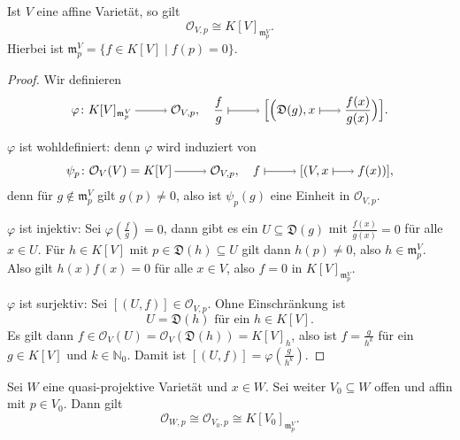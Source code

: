 \documentclass[a4paper,12pt]{scrbook}
\theoremstyle{keinenummern} %
\theoremstyle{mitnummern}
\theoremstyle{unserbeweis}
\newtheorem{proof}{Beweis}
\def\O{\mathcal{O}}
\newcommand{\D}{\mathfrak{D}}
\def\m{\mathfrak{m}}
\renewcommand{\phi}{\varphi}
\newcommand{\set}[1]{\ensuremath{\mathbb{#1}}}
\newcommand{\N}{\set{N}}
\newcommand{\smapsto}{\raisebox{-1pt}{\tikz{\draw[thin,shorten >=3pt, |->] (0,0) node{\hspace*{0pt}} -- node{} (0.7,0);}}\penalty1000\relax}
\newcommand{\ra}{\raisebox{-1pt}{\tikz{\draw[thin,shorten >=3pt, ->] (0,0) node{\hspace*{-2pt}} -- node{} (1,0);}}\penalty1000\relax}
\renewcommand{\mapsto}{\raisebox{-1pt}{\tikz{\draw[thin,shorten >=3pt, |->] (0,0) node{\hspace*{0pt}} -- node{} (1,0);}}\penalty1000\relax}
\begin{document}
\begin{prop}\label{3.1.5}
  Ist $V$ eine affine Varietät, so gilt \[ \O_{V,p}\cong K[V]_{\m_p^V}. \]
  Hierbei ist $\m_p^V = \{ f\in K[V] \mid f(p)=0\}$.
\end{prop}
\begin{proof}
  Wir definieren
  \[ \phi\colon K[V]_{\m_p^V}\ra\O_{V,p},\quad\frac{f}{g}\mapsto\Bigl[\Bigl(\D(g),x\smapsto\frac{f(x)}{g(x)}\Bigr)\Bigr]. \]

  $\phi$ ist wohldefiniert: denn $\phi$ wird induziert von
  \[ \psi_p\colon \O_V(V)=K[V]\ra\O_{V,p},\quad f\mapsto[(V,x\smapsto f(x))], \]
  denn für $g\notin \m_p^V$ gilt $g(p)\neq0$, also ist $\psi_p(g)$ eine Einheit in $\O_{V,p}$.

  $\phi$ ist injektiv: Sei $\phi(\frac{f}{g})=0$, dann gibt es ein $U\subseteq\D(g)$ mit $\frac{f(x)}{g(x)}=0$ für alle $x\in
  U$. Für $h\in K[V]$ mit $p\in\D(h)\subseteq U$ gilt dann $h(p)\neq0$, also $h\in \m_p^V$. Also gilt $h(x)f(x)=0$ für alle
  $x\in V$, also $f=0$ in $K[V]_{\m_p^V}$.

  $\phi$ ist surjektiv: Sei $[(U,f)]\in\O_{V,p}$. Ohne Einschränkung ist \[U=\D(h)\text{ für ein }h\in K[V].\] Es gilt dann
  $f\in\O_V(U)=\O_V(\D(h))=K[V]_h$, also ist $f=\frac{g}{h^k}$ für ein $g\in K[V]$ und $k\in\N_0$. Damit ist
  $[(U,f)]=\phi(\frac{g}{h^k})$.  
\end{proof}

\begin{kor}\label{3.1.6}
  Sei $W$ eine quasi-projektive Varietät und $x\in W$. Sei weiter $V_0\subseteq W$ offen und affin mit $p\in V_0$. Dann gilt
  \[ \O_{W,p} \cong \O_{V_0,p} \cong K[V_0]_{\m_p^V}. \]
\end{kor}
\end{document}
